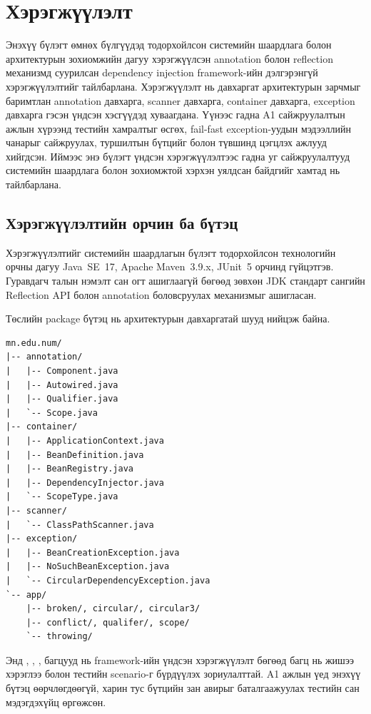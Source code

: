 \chapter{Хэрэгжүүлэлт}

Энэхүү бүлэгт өмнөх бүлгүүдэд тодорхойлсон системийн шаардлага болон
архитектурын зохиомжийн дагуу хэрэгжүүлсэн annotation болон reflection
механизмд суурилсан dependency injection framework-ийн дэлгэрэнгүй
хэрэгжүүлэлтийг тайлбарлана. Хэрэгжүүлэлт нь давхаргат архитектурын
зарчмыг баримтлан annotation давхарга, scanner давхарга, container
давхарга, exception давхарга гэсэн үндсэн хэсгүүдэд хуваагдана. Үүнээс
гадна A1 сайжруулалтын ажлын хүрээнд тестийн хамралтыг өсгөх,
fail-fast exception-уудын мэдээллийн чанарыг сайжруулах, туршилтын
бүтцийг  болон  түвшинд цэгцлэх
ажлууд хийгдсэн. Иймээс энэ бүлэгт үндсэн хэрэгжүүлэлтээс гадна уг
сайжруулалтууд системийн шаардлага болон зохиомжтой хэрхэн уялдсан
байдгийг хамтад нь тайлбарлана.

\section{Хэрэгжүүлэлтийн орчин ба бүтэц}

Хэрэгжүүлэлтийг системийн шаардлагын бүлэгт тодорхойлсон технологийн
орчны дагуу Java~SE~17, Apache Maven~3.9.x, JUnit~5 орчинд гүйцэтгэв.
Гуравдагч талын нэмэлт сан огт ашиглаагүй бөгөөд зөвхөн JDK стандарт
сангийн Reflection API болон annotation боловсруулах механизмыг ашигласан.

Төслийн package бүтэц нь архитектурын давхаргатай шууд нийцэж байна.

\begin{verbatim}
mn.edu.num/
|-- annotation/
|   |-- Component.java
|   |-- Autowired.java
|   |-- Qualifier.java
|   `-- Scope.java
|-- container/
|   |-- ApplicationContext.java
|   |-- BeanDefinition.java
|   |-- BeanRegistry.java
|   |-- DependencyInjector.java
|   `-- ScopeType.java
|-- scanner/
|   `-- ClassPathScanner.java
|-- exception/
|   |-- BeanCreationException.java
|   |-- NoSuchBeanException.java
|   `-- CircularDependencyException.java
`-- app/
    |-- broken/, circular/, circular3/
    |-- conflict/, qualifer/, scope/
    `-- throwing/
\end{verbatim}

Энд , , ,
 багцууд нь framework-ийн үндсэн хэрэгжүүлэлт бөгөөд
 багц нь жишээ хэрэглээ болон тестийн scenario-г бүрдүүлэх
зориулалттай. A1 ажлын үед энэхүү бүтэц өөрчлөгдөөгүй, харин тус
бүтцийн зан авирыг баталгаажуулах тестийн сан мэдэгдэхүйц өргөжсөн.

